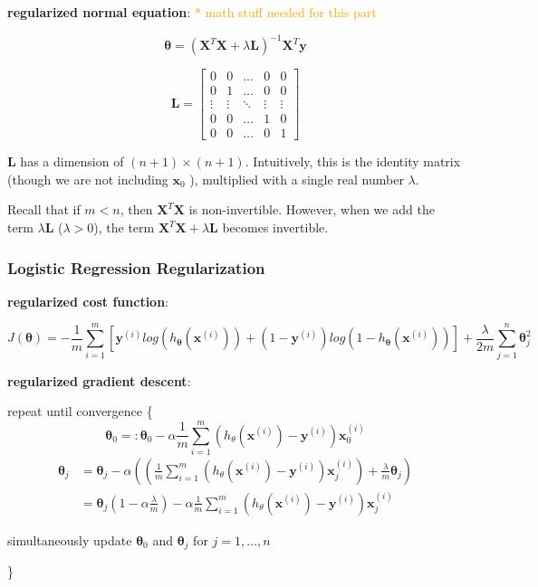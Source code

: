 \documentclass{article}
\begin{document}
\bigskip

\noindent \textbf{regularized normal equation}: \textcolor{orange}{ * math stuff needed for this part}

\[
\boldsymbol{\theta} = (\textbf{X}^T\textbf{X} + \lambda \textbf{L})^{-1}\textbf{X}^T\textbf{y}
\]

\[
\textbf{L} = 
\begin{bmatrix}
0 & 0 & \dots & 0 & 0\\
0 & 1 & \dots & 0 & 0\\
\vdots & \vdots & \ddots & \vdots & \vdots\\
0 & 0 & \dots & 1 & 0\\
0 & 0 & \dots & 0 & 1
\end{bmatrix}
\]

\bigskip

\noindent \textbf{L} has a dimension of \((n + 1) \times (n + 1)\). Intuitively, this is the identity matrix (though we are not including \(\textbf{x}_0\) ), multiplied with a single real number \(\lambda\).

\bigskip

\noindent Recall that if \(m < n\), then \(\textbf{X}^T\textbf{X}\) is non-invertible. However, when we add the term \(\lambda \textbf{L}\) (\(\lambda > 0\)), the term \(\textbf{X}^T\textbf{X} + \lambda \textbf{L}\) becomes invertible.

\subsubsection{Logistic Regression Regularization}

\noindent \textbf{regularized cost function}:

\[J(\boldsymbol{\theta}) = - \frac{1}{m} \sum_{i = 1}^{m} [\textbf{y}^{(i)} log(h_{\boldsymbol{\theta}} (\textbf{x}^{(i)})) + (1 - \textbf{y}^{(i)}) log(1 - h_{\boldsymbol{\theta}} (\textbf{x}^{(i)}))] + \frac{\lambda}{2m} \sum_{j = 1}^n \boldsymbol{\theta}_j^2\]

\noindent \textbf{regularized gradient descent}:

\noindent repeat until convergence \{
\[\boldsymbol{\theta}_0 =: \boldsymbol{\theta}_0 - \alpha \frac{1}{m} \sum_{i = 1}^m (h_{\theta}(\textbf{x}^{(i)}) - \textbf{y}^{(i)}) \textbf{x}^{(i)}_0\]
\begin{equation*}
\begin{split}
\boldsymbol{\theta}_j & = \boldsymbol{\theta}_j - \alpha ((\frac{1}{m} \sum_{i = 1}^m (h_{\theta}(\textbf{x}^{(i)}) - \textbf{y}^{(i)}) \textbf{x}^{(i)}_j) + \frac{\lambda}{m} \boldsymbol{\theta}_j) \\
 & = \boldsymbol{\theta}_j (1 - \alpha \frac{\lambda}{m}) - \alpha \frac{1}{m} \sum_{i = 1}^m (h_{\theta}(\textbf{x}^{(i)}) - \textbf{y}^{(i)}) \textbf{x}^{(i)}_j
\end{split}
\end{equation*}

\centerline{simultaneously update \(\boldsymbol{\theta}_0\) and \(\boldsymbol{\theta}_j\) for \(j = 1, \dots, n\)}
\}

\printindex
\end{document}
